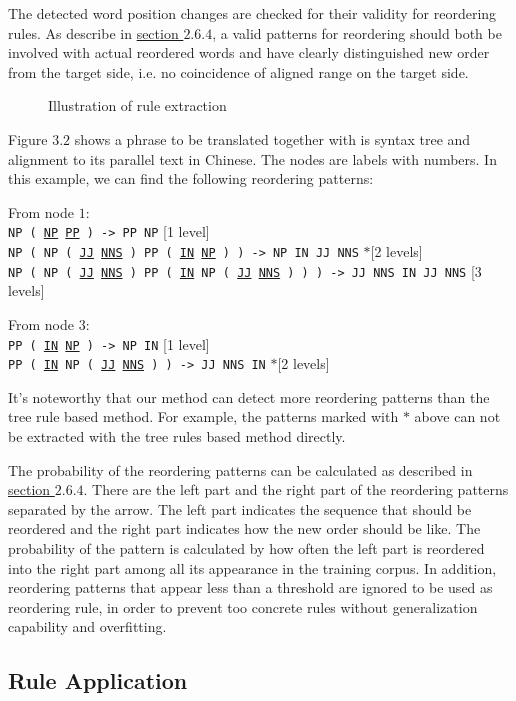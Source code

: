 The detected word position changes are checked for their validity for reordering rules. As describe in \hyperref[general]{section $2.6.4$}, a valid patterns for reordering should both be involved with actual reordered words and have clearly distinguished new order from the target side, i.e. no coincidence of aligned range on the target side.

\begin{figure}[H]
\centering

\caption{Illustration of rule extraction}
\end{figure}

Figure $3.2$ shows a phrase to be translated together with is syntax tree and alignment to its parallel text in Chinese. The nodes are labels with numbers. In this example, we can find the following reordering patterns:

From node $1$:\\
\texttt{NP ( \ul{NP} \ul{PP} ) -> PP NP} \hfill [1 level]\\
\texttt{NP ( NP ( \ul{JJ} \ul{NNS} ) PP ( \ul{IN} \ul{NP} ) ) -> NP IN JJ NNS} \hfill $*$[2 levels]\\
\texttt{NP ( NP ( \ul{JJ} \ul{NNS} ) PP ( \ul{IN} NP ( \ul{JJ} \ul{NNS} ) ) ) -> JJ NNS IN JJ NNS} \hfill [3 levels]

From node $3$:\\
\texttt{PP ( \ul{IN} \ul{NP} ) -> NP IN} \hfill [1 level]\\
\texttt{PP ( \ul{IN} NP ( \ul{JJ} \ul{NNS} ) ) -> JJ NNS IN} \hfill $*$[2 levels]

It's noteworthy that our method can detect more reordering patterns than the tree rule based method. For example, the patterns marked with $*$ above can not be extracted with the tree rules based method directly.

The probability of the reordering patterns can be calculated as described in \hyperref[general]{section $2.6.4$}. There are the left part and the right part of the reordering patterns separated by the arrow. The left part indicates the sequence that should be reordered and the right part indicates how the new order should be like. The probability of the pattern is calculated by how often the left part is reordered into the right part among all its appearance in the training corpus. In addition, reordering patterns that appear less than a threshold are ignored to be used as reordering rule, in order to prevent too concrete rules without generalization capability and overfitting.

\subsection{Rule Application}

